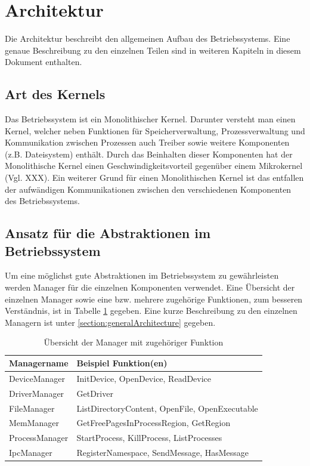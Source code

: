 \section{Architektur}
\label{chapArch}
Die Architektur beschreibt den allgemeinen Aufbau des Betriebssystems. Eine genaue Beschreibung zu den einzelnen Teilen sind in weiteren Kapiteln in diesem Dokument enthalten.

\subsection{Art des Kernels}
Das Betriebssystem ist ein Monolithischer Kernel. Darunter versteht man einen Kernel, welcher neben Funktionen für Speicherverwaltung, Prozessverwaltung und Kommunikation zwischen Prozessen auch Treiber sowie weitere Komponenten (z.B. Dateisystem) enthält. Durch das Beinhalten dieser Komponenten hat der Monolithische Kernel einen Geschwindigkeitsvorteil gegenüber einem Mikrokernel (Vgl. XXX).
Ein weiterer Grund für einen Monolithischen Kernel ist das entfallen der aufwändigen Kommunikationen zwischen den verschiedenen Komponenten des Betriebssystems.

\subsection{Ansatz für die Abstraktionen im Betriebssystem}
Um eine möglichst gute Abstraktionen im Betriebssystem zu gewährleisten werden Manager für die einzelnen Komponenten verwendet. Eine Übersicht der einzelnen Manager sowie eine bzw. mehrere zugehörige Funktionen, zum besseren Verständnis, ist in Tabelle \ref{table:Manager-function} gegeben. Eine kurze Beschreibung zu den einzelnen Managern ist unter \ref{section:generalArchitecture} gegeben.

\begin{table}[H]
\begin{tabular}{p{4cm} | p{9cm}}
  \textbf{Managername} & \textbf{Beispiel Funktion(en)} \\ 
  \hline
  DeviceManager & InitDevice, OpenDevice, ReadDevice \\
  DriverManager & GetDriver \\
  FileManager & ListDirectoryContent, OpenFile, OpenExecutable \\
  MemManager & GetFreePagesInProcessRegion, GetRegion \\
  ProcessManager & StartProcess, KillProcess, ListProcesses \\
  IpcManager & RegisterNamespace, SendMessage, HasMessage \\
 \end{tabular}
 \caption{Übersicht der Manager mit zugehöriger Funktion}
 \label{table:Manager-function}
\end{table}

